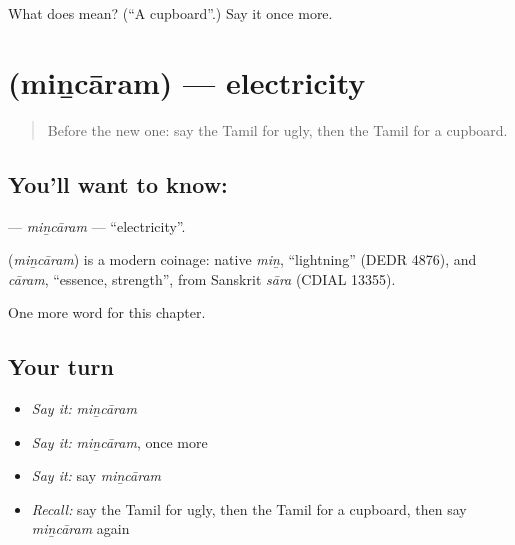 \begin{tcolorbox}[breakable,colback=teal!4,colframe=teal!35!black,title={Before you move on}]
What does  mean? (\textquotedblleft{}A cupboard\textquotedblright{}.) Say it once more.
\end{tcolorbox}
\section[\texorpdfstring{\ta{மின்சாரம்} (miṉcāram)}{மின்சாரம் (miṉcāram)}]{ (miṉcāram) — electricity}

\label{lesson:TA-C213-mincaram}



\begin{quote}
Before the new one: say the Tamil for ugly, then the Tamil for a cupboard.
\end{quote}

\subsection*{You'll want to know: }
\textbf{} — \emph{miṉcāram} — \textquotedblleft{}electricity\textquotedblright{}.

\begin{cousinweb}
\textbf{} (\emph{miṉcāram}) is a modern coinage: native \emph{miṉ}, \textquotedblleft{}lightning\textquotedblright{} (DEDR 4876), and \emph{cāram}, \textquotedblleft{}essence, strength\textquotedblright{}, from Sanskrit \emph{sāra} (CDIAL 13355).
\end{cousinweb}

\begin{grammarlens}[title={What you've built}]
One more word for this chapter.
\end{grammarlens}

\subsection*{Your turn}
\begin{itemize}
\raggedright
  \item \emph{Say it:} \emph{miṉcāram}
  \item \emph{Say it:} \emph{miṉcāram}, once more
  \item \emph{Say it:} say \emph{miṉcāram}
  \item \emph{Recall:} say the Tamil for ugly, then the Tamil for a cupboard, then say \emph{miṉcāram} again
\end{itemize}

